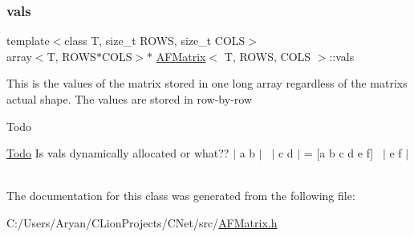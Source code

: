 \mbox{\label{class_a_f_matrix_abca47cc50d551c1e8d79559773729e87}} 
\subsubsection{\texorpdfstring{vals}{vals}}
{\footnotesize\ttfamily template$<$class T, size\+\_\+t R\+O\+WS, size\+\_\+t C\+O\+LS$>$ \\
array$<$T, R\+O\+WS$\ast$C\+O\+LS$>$$\ast$ \hyperlink{class_a_f_matrix}{A\+F\+Matrix}$<$ T, R\+O\+WS, C\+O\+LS $>$\+::vals}

This is the values of the matrix stored in one long array regardless of the matrix\textquotesingle{}s actual shape. The values are stored in row-\/by-\/row

\begin{DoxyRefDesc}{Todo}
\item[\hyperlink{todo__todo000001}{Todo}]Is vals dynamically allocated or what?? $\vert$ a b $\vert$~\newline
$\vert$ c d $\vert$ = \mbox{[}a b c d e f\mbox{]}~\newline
$\vert$ e f $\vert$~\newline
\end{DoxyRefDesc}


The documentation for this class was generated from the following file\+:\begin{DoxyCompactItemize}
\item 
C\+:/\+Users/\+Aryan/\+C\+Lion\+Projects/\+C\+Net/src/\hyperlink{_a_f_matrix_8h}{A\+F\+Matrix.\+h}\end{DoxyCompactItemize}
